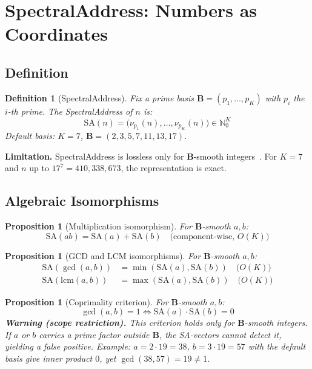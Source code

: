 \documentclass[10pt,twocolumn]{article}
\newtheorem{proposition}[theorem]{Proposition}
\newtheorem{definition}[theorem]{Definition}
\newcommand{\SA}{\mathrm{SA}}
\newcommand{\B}{\mathbf{B}}
\begin{document}
\section{SpectralAddress: Numbers as Coordinates}

\subsection{Definition}

\begin{definition}[SpectralAddress]\label{def:sa}
Fix a prime basis $\B = (p_1, \ldots, p_K)$ with $p_i$ the $i$-th prime.
The SpectralAddress of $n$ is:
\[
\SA(n) = \bigl(\nu_{p_1}(n), \ldots, \nu_{p_K}(n)\bigr)
         \in \mathbb{N}_0^K
\]
Default basis: $K=7$, $\B=(2,3,5,7,11,13,17)$.
\end{definition}

\noindent\textbf{Limitation.} SpectralAddress is lossless only for
$\B$-smooth integers~\cite{Hildebrand1986}. For $K=7$ and $n$ up to
$17^7 = 410{,}338{,}673$, the representation is exact.

\subsection{Algebraic Isomorphisms}

\begin{proposition}[Multiplication isomorphism]\label{prop:mult-isom}
For $\B$-smooth $a, b$:
\[
\SA(ab) = \SA(a) + \SA(b)
\quad \text{(component-wise, $O(K)$)}
\]
\end{proposition}

\begin{proposition}[GCD and LCM isomorphisms]\label{prop:gcd-lcm-isom}
For $\B$-smooth $a, b$:
\begin{align*}
\SA(\gcd(a,b)) &= \min(\SA(a), \SA(b)) \quad \text{($O(K)$)} \\
\SA(\mathrm{lcm}(a,b)) &= \max(\SA(a), \SA(b)) \quad \text{($O(K)$)}
\end{align*}
\end{proposition}

\begin{proposition}[Coprimality criterion]\label{prop:coprime}
For $\B$-smooth $a, b$:
\[
\gcd(a,b) = 1 \iff \SA(a) \cdot \SA(b) = 0
\]
\textbf{Warning (scope restriction).} This criterion holds \emph{only}
for $\B$-smooth integers. If $a$ or $b$ carries a prime factor outside
$\B$, the SA-vectors cannot detect it, yielding a false positive.
\emph{Example:} $a = 2 \cdot 19 = 38$, $b = 3 \cdot 19 = 57$ with the
default basis give inner product $0$, yet $\gcd(38,57)=19\neq 1$.
\end{proposition}
\end{document}
